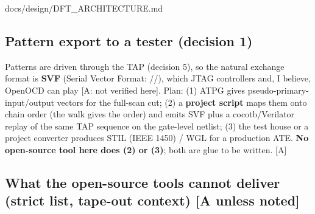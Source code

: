 \begin{relocated}{docs/design/DFT_ARCHITECTURE.md}
\subsection{Pattern export to a tester (decision 1)}\label{tm:ch:dft-architecture:23-pattern-export-to-a-tester-decision-1}

Patterns are driven through the TAP (decision 5), so the natural
exchange format is \textbf{SVF} (Serial Vector Format:
//), which JTAG controllers and, I
believe, OpenOCD can play {[}A: not verified here{]}. Plan: (1) ATPG
gives pseudo-primary-input/\allowbreak{}output vectors for the full-scan
cut; (2) a \textbf{project script} maps them onto chain order (the
 walk gives the order) and emits SVF plus a
cocotb/\allowbreak{}Verilator replay of the same TAP sequence on the
gate-level netlist; (3) the test house or a project converter produces
STIL (IEEE 1450) / WGL for a production ATE. \textbf{No open-source tool
here does (2) or (3)}; both are glue to be written. {[}A{]}

\subsection{What the open-source tools cannot deliver (strict list,
tape-out context) {[}A unless noted{]}}\label{tm:ch:dft-architecture:24-what-the-open-source-tools-cannot-deliver-strict-list-tape-out-context-a-unless-noted}


\end{relocated}
